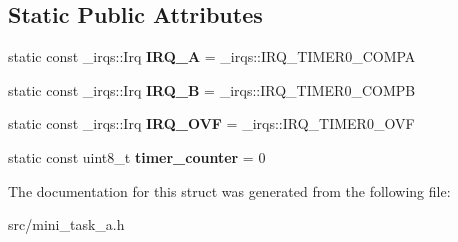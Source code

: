 \subsection*{Static Public Attributes}
\begin{DoxyCompactItemize}
\item 
static const \+\_\+irqs\+::\+Irq {\bfseries I\+R\+Q\+\_\+A} = \+\_\+irqs\+::\+I\+R\+Q\+\_\+\+T\+I\+M\+E\+R0\+\_\+\+C\+O\+M\+PA\hypertarget{struct__timer_1_1Timer0_a3de7fc396d57e150d5b418ee95bd403b}{}\label{struct__timer_1_1Timer0_a3de7fc396d57e150d5b418ee95bd403b}

\item 
static const \+\_\+irqs\+::\+Irq {\bfseries I\+R\+Q\+\_\+B} = \+\_\+irqs\+::\+I\+R\+Q\+\_\+\+T\+I\+M\+E\+R0\+\_\+\+C\+O\+M\+PB\hypertarget{struct__timer_1_1Timer0_a0cb6846ecb7f22d0ac2e15fc1e262c42}{}\label{struct__timer_1_1Timer0_a0cb6846ecb7f22d0ac2e15fc1e262c42}

\item 
static const \+\_\+irqs\+::\+Irq {\bfseries I\+R\+Q\+\_\+\+O\+VF} = \+\_\+irqs\+::\+I\+R\+Q\+\_\+\+T\+I\+M\+E\+R0\+\_\+\+O\+VF\hypertarget{struct__timer_1_1Timer0_a0513d98f8fe79a9ddd0183bc11560e92}{}\label{struct__timer_1_1Timer0_a0513d98f8fe79a9ddd0183bc11560e92}

\item 
static const uint8\+\_\+t {\bfseries timer\+\_\+counter} = 0\hypertarget{struct__timer_1_1Timer0_a3e3b21ef1c26662d898e509582e6928f}{}\label{struct__timer_1_1Timer0_a3e3b21ef1c26662d898e509582e6928f}

\end{DoxyCompactItemize}


The documentation for this struct was generated from the following file\+:\begin{DoxyCompactItemize}
\item 
src/mini\+\_\+task\+\_\+a.\+h\end{DoxyCompactItemize}
